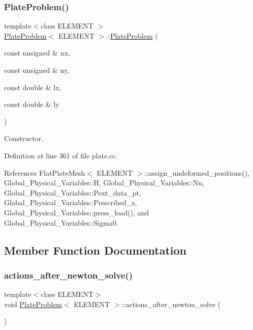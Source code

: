\subsubsection{\texorpdfstring{Plate\+Problem()}{PlateProblem()}}
{\footnotesize\ttfamily template$<$class E\+L\+E\+M\+E\+NT $>$ \\
\hyperlink{classPlateProblem}{Plate\+Problem}$<$ E\+L\+E\+M\+E\+NT $>$\+::\hyperlink{classPlateProblem}{Plate\+Problem} (\begin{DoxyParamCaption}\item[{const unsigned \&}]{nx,  }\item[{const unsigned \&}]{ny,  }\item[{const double \&}]{lx,  }\item[{const double \&}]{ly }\end{DoxyParamCaption})}



Constructor. 



Definition at line 361 of file plate.\+cc.



References Flat\+Plate\+Mesh$<$ E\+L\+E\+M\+E\+N\+T $>$\+::assign\+\_\+undeformed\+\_\+positions(), Global\+\_\+\+Physical\+\_\+\+Variables\+::H, Global\+\_\+\+Physical\+\_\+\+Variables\+::\+Nu, Global\+\_\+\+Physical\+\_\+\+Variables\+::\+Pext\+\_\+data\+\_\+pt, Global\+\_\+\+Physical\+\_\+\+Variables\+::\+Prescribed\+\_\+z, Global\+\_\+\+Physical\+\_\+\+Variables\+::press\+\_\+load(), and Global\+\_\+\+Physical\+\_\+\+Variables\+::\+Sigma0.



\subsection{Member Function Documentation}
\mbox{\label{classPlateProblem_aef1dfbdffcee81632af385733cb534f7}} 
\subsubsection{\texorpdfstring{actions\+\_\+after\+\_\+newton\+\_\+solve()}{actions\_after\_newton\_solve()}}
{\footnotesize\ttfamily template$<$class E\+L\+E\+M\+E\+NT$>$ \\
void \hyperlink{classPlateProblem}{Plate\+Problem}$<$ E\+L\+E\+M\+E\+NT $>$\+::actions\+\_\+after\+\_\+newton\+\_\+solve (\begin{DoxyParamCaption}{ }\end{DoxyParamCaption})\hspace{0.3cm}{\ttfamily [inline]}}




